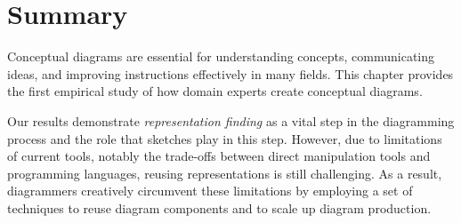 

\section{Summary}

Conceptual diagrams are essential for understanding concepts, communicating ideas, and improving instructions effectively in many fields. This chapter provides the first empirical study of how domain experts create conceptual diagrams.

Our results demonstrate \emph{representation finding} as a vital step in the diagramming process and the role that sketches play in this step. However, due to limitations of current tools, notably the trade-offs between direct manipulation tools and programming languages, reusing representations is still challenging. As a result, diagrammers creatively circumvent these limitations by employing a set of  techniques to reuse diagram components and to scale up diagram production. 

